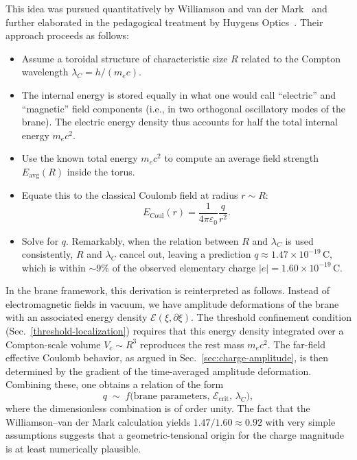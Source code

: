 This idea was pursued quantitatively by Williamson and van der
Mark~\cite{Williamson1997} and further elaborated in the pedagogical
treatment by Huygens Optics~\cite{HuygensOptics2025}. Their approach
proceeds as follows:
\begin{itemize}
\tightlist
\item
  Assume a toroidal structure of characteristic size $R$ related to the
  Compton wavelength $\lambda_C = h/(m_e c)$.
\item
  The internal energy is stored equally in what one would call
  ``electric'' and ``magnetic'' field components (i.e., in two orthogonal
  oscillatory modes of the brane). The electric energy density thus accounts
  for half the total internal energy $m_e c^2$.
\item
  Use the known total energy $m_e c^2$ to compute an average field strength
  $E_{\mathrm{avg}}(R)$ inside the torus.
\item
  Equate this to the classical Coulomb field at radius $r \sim R$:
  \[
    E_{\mathrm{Coul}}(r) = \frac{1}{4\pi\varepsilon_0}\frac{q}{r^2}.
  \]
\item
  Solve for $q$. Remarkably, when the relation between $R$ and
  $\lambda_C$ is used consistently, $R$ and $\lambda_C$ cancel out, leaving
  a prediction $q \approx 1.47 \times 10^{-19}\,\mathrm{C}$, which is
  within $\sim 9\%$ of the observed elementary charge $|e| = 1.60 \times
  10^{-19}\,\mathrm{C}$.
\end{itemize}

In the brane framework, this derivation is reinterpreted as follows.
Instead of electromagnetic fields in vacuum, we have amplitude deformations
of the brane with an associated energy density $\mathcal{E}(\xi,\partial\xi)$.
The threshold confinement condition (Sec.~\ref{threshold-localization})
requires that this energy density integrated over a Compton-scale volume
$V_c \sim R^3$ reproduces the rest mass $m_e c^2$. The far-field
effective Coulomb behavior, as argued in Sec.~\ref{sec:charge-amplitude}, is
then determined by the gradient of the time-averaged amplitude deformation.
Combining these, one obtains a relation of the form
\[
  q \;\sim\;
  f\bigl(\text{brane parameters},\, \mathcal{E}_{\mathrm{crit}},\,
  \lambda_C\bigr),
\]
where the dimensionless combination is of order unity. The fact that the
Williamson--van der Mark calculation yields $1.47 / 1.60 \approx 0.92$
with very simple assumptions suggests that a geometric-tensional origin
for the charge magnitude is at least numerically plausible.

